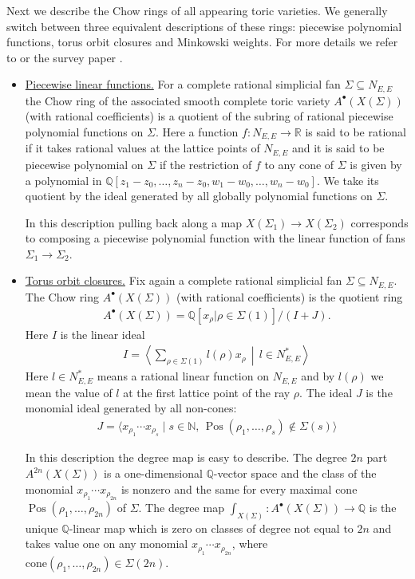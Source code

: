 \documentclass[12pt,a4paper,english]{scrartcl}
\newcommand{\NN}{\mathbb{N}}
\newcommand{\QQ}{\mathbb{Q}}
\newcommand{\RR}{\mathbb{R}}
\DeclareMathOperator{\pos}{Pos}
\begin{document}
Next we describe the Chow rings of all appearing toric varieties. We generally switch between three equivalent descriptions of these rings: piecewise polynomial functions, torus orbit closures and Minkowski weights. For more details we refer to \cite[Chapter 12.5]{CLS} or the survey paper \cite{ArdilaMantilla2024}.

\begin{itemize}
    \item \underline{Piecewise linear functions.} For a complete rational simplicial fan $\Sigma\subseteq N_{E,E}$ the Chow ring of the associated smooth complete toric variety $A^\bullet(X(\Sigma))$ (with rational coefficients) is a quotient of the subring of rational piecewise polynomial functions on $\Sigma$. Here a function $f:N_{E,E}\to \RR$ is said to be rational if it takes rational values at the lattice points of $N_{E,E}$ and it is said to be piecewise polynomial on $\Sigma$ if the restriction of $f$ to any cone of $\Sigma$ is given by a polynomial in $\QQ[z_1-z_0,\ldots,z_n-z_0,w_1-w_0,\ldots,w_n-w_0]$. We take its quotient by the ideal generated by all globally polynomial functions on $\Sigma$.

    In this description pulling back along a map $X(\Sigma_1)\to X(\Sigma_2)$ corresponds to composing a piecewise polynomial function with the linear function of fans $\Sigma_1\to \Sigma_2$.
    \item \underline{Torus orbit closures.} Fix again a complete rational simplicial fan $\Sigma\subseteq N_{E,E}$. The Chow ring $A^\bullet(X(\Sigma))$  (with rational coefficients) is the quotient ring \begin{align}
    \label{eq:torusorbitchow}
A^\bullet(X(\Sigma))=\QQ[x_\rho|\rho \in \Sigma(1)]/(I+J).
    \end{align}
    Here $I$ is the linear ideal \begin{align*}
        I=\left\langle \textstyle\sum_{\rho \in \Sigma(1)}l(\rho)x_\rho \,\middle|\, l \in N_{E,E}^*  \right\rangle
    \end{align*}
    Here $l\in N_{E,E}^*$ means a rational linear function on $N_{E,E}$ and by $l(\rho)$ we mean the value of $l$ at the first lattice point of the ray $\rho$. The ideal $J$ is the monomial ideal generated by all non-cones:\begin{align*}
        J=\langle x_{\rho_1}\cdots x_{\rho_s} \mid s\in \NN,\,  \pos(\rho_1,\ldots,\rho_s) \notin \Sigma(s) \rangle
    \end{align*}

    In this description the degree map is easy to describe. The degree $2n$ part $A^{2n}(X(\Sigma))$ is a one-dimensional $\QQ$-vector space and the class of the monomial $x_{\rho_1}\cdots x_{\rho_{2n}}$ is nonzero and the same for every maximal cone $\pos(\rho_1,\ldots,\rho_{2n})$ of $\Sigma$. The degree map $\int_{X(\Sigma)}:A^\bullet(X(\Sigma))\to \QQ$ is the unique $\QQ$-linear map which is zero on classes of degree not equal to $2n$ and takes value one on any monomial $x_{\rho_1}\cdots x_{\rho_{2n}}$, where $\text{cone}(\rho_1,\ldots,\rho_{2n})\in \Sigma(2n)$.

\end{itemize}
\end{document}
